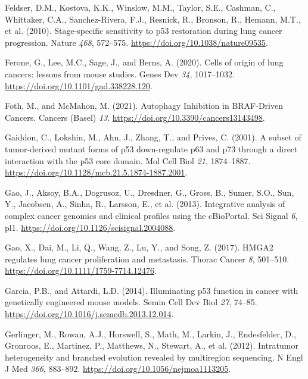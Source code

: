 \begin{CSLReferences}{0}{0}
\leavevmode{}%
Feldser, D.M., Kostova, K.K., Winslow, M.M., Taylor, S.E., Cashman, C., Whittaker, C.A., Sanchez-Rivera, F.J., Resnick, R., Bronson, R., Hemann, M.T., et al. (2010). Stage-specific sensitivity to p53 restoration during lung cancer progression. Nature \emph{468}, 572--575. \url{https://doi.org/10.1038/nature09535}.

\leavevmode{}%
Ferone, G., Lee, M.C., Sage, J., and Berns, A. (2020). Cells of origin of lung cancers: lessons from mouse studies. Genes Dev \emph{34}, 1017--1032. \url{https://doi.org/10.1101/gad.338228.120}.

\leavevmode{}%
Foth, M., and McMahon, M. (2021). Autophagy Inhibition in BRAF-Driven Cancers. Cancers (Basel) \emph{13}. \url{https://doi.org/10.3390/cancers13143498}.

\leavevmode{}%
Gaiddon, C., Lokshin, M., Ahn, J., Zhang, T., and Prives, C. (2001). A subset of tumor-derived mutant forms of p53 down-regulate p63 and p73 through a direct interaction with the p53 core domain. Mol Cell Biol \emph{21}, 1874--1887. \url{https://doi.org/10.1128/mcb.21.5.1874-1887.2001}.

\leavevmode{}%
Gao, J., Aksoy, B.A., Dogrusoz, U., Dresdner, G., Gross, B., Sumer, S.O., Sun, Y., Jacobsen, A., Sinha, R., Larsson, E., et al. (2013). Integrative analysis of complex cancer genomics and clinical profiles using the cBioPortal. Sci Signal \emph{6}, pl1. \url{https://doi.org/10.1126/scisignal.2004088}.

\leavevmode{}%
Gao, X., Dai, M., Li, Q., Wang, Z., Lu, Y., and Song, Z. (2017). HMGA2 regulates lung cancer proliferation and metastasis. Thorac Cancer \emph{8}, 501--510. \url{https://doi.org/10.1111/1759-7714.12476}.

\leavevmode{}%
Garcia, P.B., and Attardi, L.D. (2014). Illuminating p53 function in cancer with genetically engineered mouse models. Semin Cell Dev Biol \emph{27}, 74--85. \url{https://doi.org/10.1016/j.semcdb.2013.12.014}.

\leavevmode{}%
Gerlinger, M., Rowan, A.J., Horswell, S., Math, M., Larkin, J., Endesfelder, D., Gronroos, E., Martinez, P., Matthews, N., Stewart, A., et al. (2012). Intratumor heterogeneity and branched evolution revealed by multiregion sequencing. N Engl J Med \emph{366}, 883--892. \url{https://doi.org/10.1056/nejmoa1113205}.


\end{CSLReferences}
